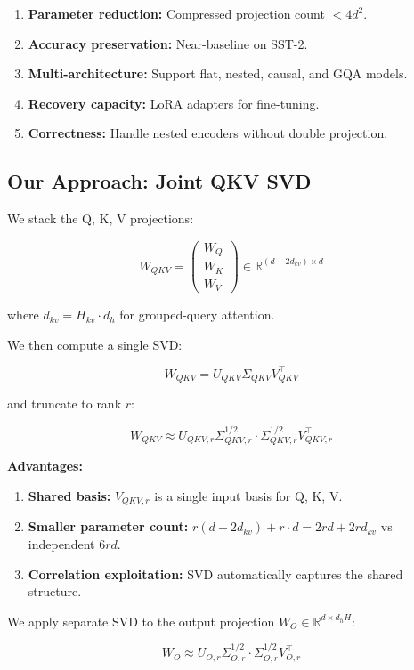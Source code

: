 \begin{enumerate}
\item \textbf{Parameter reduction:} Compressed projection count $< 4 d^2$.
\item \textbf{Accuracy preservation:} Near-baseline on SST-2.
\item \textbf{Multi-architecture:} Support flat, nested, causal, and GQA models.
\item \textbf{Recovery capacity:} LoRA adapters for fine-tuning.
\item \textbf{Correctness:} Handle nested encoders without double projection.

\end{enumerate}
\subsection{Our Approach: Joint QKV SVD}

We stack the Q, K, V projections:

\[
W_{QKV} = \begin{pmatrix} W_Q \\ W_K \\ W_V \end{pmatrix} \in \mathbb{R}^{(d + 2 d_{kv}) \times d}
\]

where $d_{kv} = H_{kv} \cdot d_h$ for grouped-query attention.

We then compute a single SVD:

\[
W_{QKV} = U_{QKV} \Sigma_{QKV} V_{QKV}^\top
\]

and truncate to rank $r$:

\[
W_{QKV} \approx U_{QKV, r} \Sigma_{QKV, r}^{1/2} \cdot \Sigma_{QKV, r}^{1/2} V_{QKV, r}^\top
\]

\textbf{Advantages:}

\begin{enumerate}
\item \textbf{Shared basis:} $V_{QKV, r}$ is a single input basis for Q, K, V.
\item \textbf{Smaller parameter count:} $r(d + 2d_{kv}) + r \cdot d = 2rd + 2r d_{kv}$ vs
  independent $6rd$.
\item \textbf{Correlation exploitation:} SVD automatically captures the shared
  structure.

\end{enumerate}
We apply separate SVD to the output projection $W_O \in \mathbb{R}^{d \times d_h H}$:

\[
W_O \approx U_{O, r} \Sigma_{O, r}^{1/2} \cdot \Sigma_{O, r}^{1/2} V_{O, r}^\top
\]

